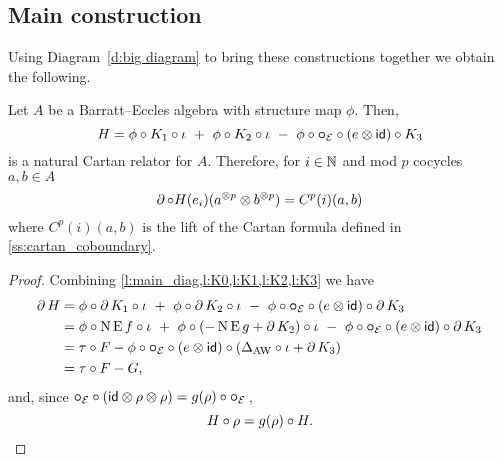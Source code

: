 \subsection{Main construction}

Using Diagram~\eqref{d:big diagram} to bring these constructions together we obtain the following.

\begin{theorem}
	Let $A$ be a Barratt--Eccles algebra with structure map $\phi$.
	Then,
	\[
	H = \phi \comp K_1 \comp \iota \ +\ \phi \comp K_2 \comp \iota \ -\ \phi \comp \bcirc_{\BE} \comp (e \ot \id) \comp K_3
	\]
	is a natural Cartan relator for $A$.
	Therefore, for $i \in \mathbb{N}$ and mod $p$ cocycles $a,b \in A$
	\[
	\operatorname{\partial} \mathbin{\circ} H(e_i)(a^{\otimes p} \otimes b^{\otimes p}) = C^p(i)(a, b)
	\]
	where $C^p(i)(a, b)$ is the lift of the Cartan formula defined in {\rm \cref{ss:cartan_coboundary}}.
\end{theorem}

\begin{proof} Combining \cref{l:main_diag,l:K0,l:K1,l:K2,l:K3} we have
	\begin{align*}
		\operatorname{\partial} H &=
		\phi \mathbin{\circ} \operatorname{\partial} K_1 \mathbin{\circ} \iota \ +\
		\phi \mathbin{\circ} \operatorname{\partial} K_2 \mathbin{\circ} \iota \ -\
		\phi \mathbin{\circ} \bm{\circ}_{\mathcal{E}} \mathbin{\circ} (e \otimes \mathsf{id}) \mathbin{\circ} \operatorname{\partial} K_3 \\ &=
		\phi \mathbin{\circ} \operatorname{N}\operatorname{E} f \mathbin{\circ} \iota \ +\
		\phi \mathbin{\circ} (-\operatorname{N}\operatorname{E} g + \operatorname{\partial} K_2) \mathbin{\circ} \iota \ -\
		\phi \mathbin{\circ} \bm{\circ}_{\mathcal{E}} \mathbin{\circ} (e \otimes \mathsf{id}) \mathbin{\circ} \operatorname{\partial} K_3 \\ &=
		\tau \mathbin{\circ} F - \phi \mathbin{\circ} \bm{\circ}_{\mathcal{E}} \mathbin{\circ} (e \otimes \mathsf{id}) \mathbin{\circ} (\Delta_{\operatorname{AW}} \mathbin{\circ} \iota + \operatorname{\partial} K_3) \\ &=
		\tau \mathbin{\circ} F - G,
	\end{align*}
	and, since $\bm{\circ}_{\mathcal{E}} \mathbin{\circ} (\mathsf{id} \otimes \rho \otimes \rho) = g(\rho) \mathbin{\circ} \bm{\circ}_{\mathcal{E}}$\,,
	\[
	H \mathbin{\circ} \rho = g(\rho) \mathbin{\circ} H. \qedhere
	\]
\end{proof}